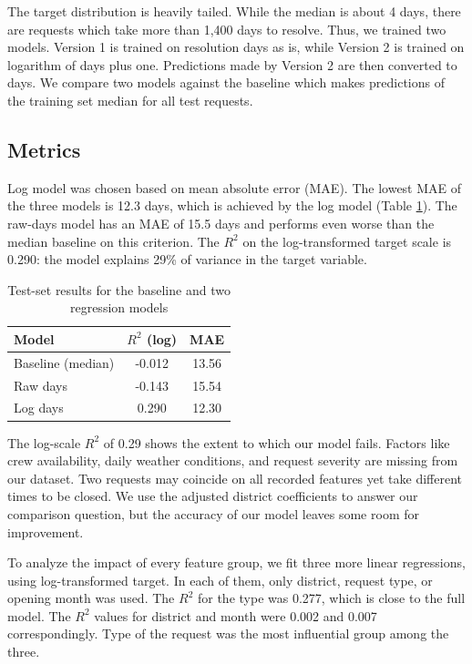 \documentclass[conference]{IEEEtran}
\begin{document}
The target distribution is heavily tailed. While the median is about 4 days, there are requests which take more than 1,400 days to resolve. Thus, we trained two models. Version 1 is trained on resolution days as is, while Version 2 is trained on logarithm of days plus one. Predictions made by Version 2 are then converted to days. We compare two models against the baseline which makes predictions of the training set median for all test requests.

\subsection{Metrics}
Log model was chosen based on mean absolute error (MAE). The lowest MAE of the three models is 12.3 days, which is achieved by the log model (Table \ref{tab:lr}). The raw-days model has an MAE of 15.5 days and performs even worse than the median baseline on this criterion. The $R^2$ on the log-transformed target scale is 0.290: the model explains 29\% of variance in the target variable.

\begin{table}[h]
\centering
\caption{Test-set results for the baseline and two regression models}
\label{tab:lr}
\begin{tabular}{lcc}
\toprule
Model & $R^2$ (log) & MAE \\
\midrule
Baseline (median) & -0.012 & 13.56 \\
Raw days & -0.143 & 15.54 \\
Log days & 0.290 & 12.30 \\
\bottomrule
\end{tabular}
\end{table}

The log-scale $R^2$ of 0.29 shows the extent to which our model fails. Factors like crew availability, daily weather conditions, and request severity are missing from our dataset. Two requests may coincide on all recorded features yet take different times to be closed. We use the adjusted district coefficients to answer our comparison question, but the accuracy of our model leaves some room for improvement.

To analyze the impact of every feature group, we fit three more linear regressions, using log-transformed target. In each of them, only district, request type, or opening month was used. The $R^2$ for the type was 0.277, which is close to the full model. The $R^2$ values for district and month were 0.002 and 0.007 correspondingly. Type of the request was the most influential group among the three.
\end{document}

